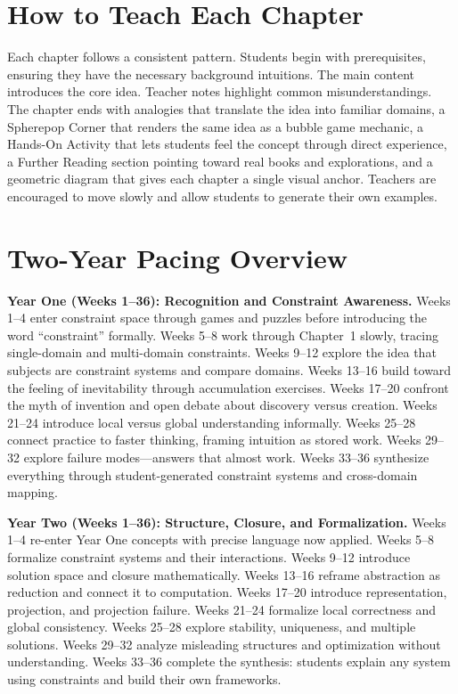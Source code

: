 \documentclass[11pt]{book}
\theoremstyle{definition}
\theoremstyle{remark}
\begin{document}
\section*{How to Teach Each Chapter}

Each chapter follows a consistent pattern. Students begin with prerequisites,
ensuring they have the necessary background intuitions. The main content
introduces the core idea. Teacher notes highlight common misunderstandings.
The chapter ends with analogies that translate the idea into familiar
domains, a Spherepop Corner that renders the same idea as a bubble game
mechanic, a Hands-On Activity that lets students feel the concept through
direct experience, a Further Reading section pointing toward real books
and explorations, and a geometric diagram that gives each chapter a
single visual anchor. Teachers are encouraged to move slowly and allow
students to generate their own examples.

\section*{Two-Year Pacing Overview}

\textbf{Year One (Weeks 1--36): Recognition and Constraint Awareness.}
Weeks 1--4 enter constraint space through games and puzzles before
introducing the word ``constraint'' formally. Weeks 5--8 work through
Chapter~1 slowly, tracing single-domain and multi-domain constraints.
Weeks 9--12 explore the idea that subjects are constraint systems and
compare domains. Weeks 13--16 build toward the feeling of inevitability
through accumulation exercises. Weeks 17--20 confront the myth of
invention and open debate about discovery versus creation. Weeks 21--24
introduce local versus global understanding informally. Weeks 25--28
connect practice to faster thinking, framing intuition as stored work.
Weeks 29--32 explore failure modes---answers that almost work.
Weeks 33--36 synthesize everything through student-generated constraint
systems and cross-domain mapping.

\textbf{Year Two (Weeks 1--36): Structure, Closure, and Formalization.}
Weeks 1--4 re-enter Year One concepts with precise language now applied.
Weeks 5--8 formalize constraint systems and their interactions.
Weeks 9--12 introduce solution space and closure mathematically.
Weeks 13--16 reframe abstraction as reduction and connect it to computation.
Weeks 17--20 introduce representation, projection, and projection failure.
Weeks 21--24 formalize local correctness and global consistency.
Weeks 25--28 explore stability, uniqueness, and multiple solutions.
Weeks 29--32 analyze misleading structures and optimization without
understanding. Weeks 33--36 complete the synthesis: students explain
any system using constraints and build their own frameworks.
\end{document}
